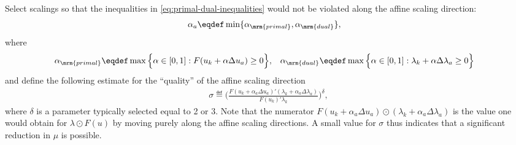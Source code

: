 \documentclass[11pt]{article}
\begin{document}
\begin{algorithm}
\begin{steps}
\item Select scalings so that the inequalities in
  \eqref{eq:primal-dual-inequalities} would not be violated along the
  affine scaling direction:
  \begin{align*}
    \alpha_a&\eqdef\min\{\alpha_\mrm{primal},\alpha_\mrm{dual}\}, 
  \end{align*}
  where
  \begin{align*}
    \alpha_\mrm{primal}&\eqdef \max\Big\{\alpha\in[0,1]:F(u_k+\alpha \Delta u_a)\ge 0\Big\}, &
    \alpha_\mrm{dual}&\eqdef \max\Big\{\alpha\in[0,1]:\lambda_k+\alpha \Delta\lambda_a\ge 0 \Big\}
  \end{align*}
  and define the following estimate for the ``quality'' of the affine
  scaling direction
  \begin{align*}
    \sigma\eqdef\Big(\frac{F(u_k+\alpha_a \Delta u_a)'(\lambda_k+\alpha_a \Delta\lambda_a)}{F(u_k)'\lambda_k}\Big)^\delta,
  \end{align*}
  where $\delta$ is a parameter typically selected equal to 2 or 3. Note that
  the numerator $F(u_k+\alpha_a \Delta u_a)\odot(\lambda_k+\alpha_a
  \Delta\lambda_a)$ is the value one would obtain for $\lambda\odot F(u)$ by moving
  purely along the affine scaling directions. A small value for $\sigma$
  thus indicates that a significant reduction in $\mu$ is possible.


\end{steps}
\end{algorithm}
\end{document}
